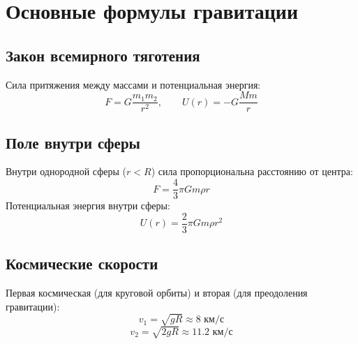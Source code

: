\documentclass{article}
\begin{document}
\section*{Основные формулы гравитации}

\subsection*{Закон всемирного тяготения}
Сила притяжения между массами и потенциальная энергия:
\[F = G\frac{m_1m_2}{r^2}, \qquad U(r) = -G\frac{Mm}{r}\]

\subsection*{Поле внутри сферы}
Внутри однородной сферы ($r < R$) сила пропорциональна расстоянию от центра:
\[F = \frac{4}{3}\pi Gm\rho r\]
Потенциальная энергия внутри сферы:
\[U(r) = \frac{2}{3}\pi Gm\rho r^2\]

\subsection*{Космические скорости}
Первая космическая (для круговой орбиты) и вторая (для преодоления гравитации):
\[v_1 = \sqrt{gR} \approx 8\text{ км/с}\]
\[v_2 = \sqrt{2gR} \approx 11.2\text{ км/с}\]
\end{document}
